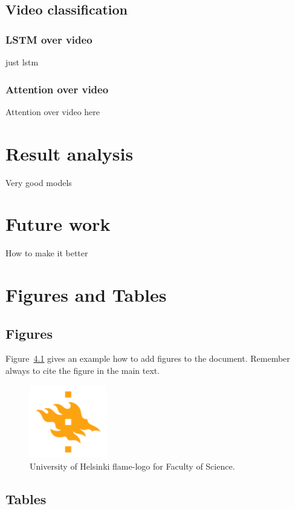 \section{Video classification}
\subsection{LSTM over video}
just lstm
\subsection{Attention over video}
Attention over video here

\chapter{Result analysis}
Very good models

\chapter{Future work}
How to make it better

\chapter{Figures and Tables}

\section{Figures}
Figure~\ref{fig:logo} gives an example how to add figures to the document. Remember always to cite the figure in the main text.

\begin{figure}[h!] 
\centering 
\includegraphics[width=0.3\textwidth]{HY-logo-ml.png}
\caption{University of Helsinki flame-logo for Faculty of Science.\label{fig:logo}}
\end{figure}

\section{Tables}

